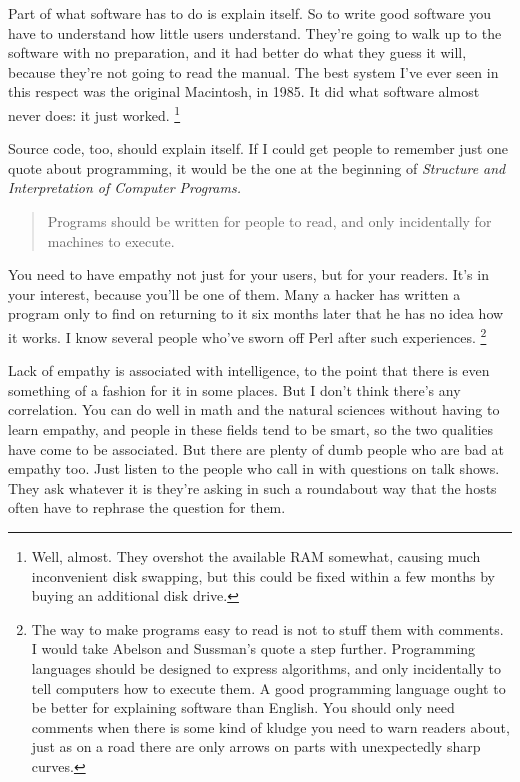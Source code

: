 Part of what software has to do is explain itself. So to write good
software you have to understand how little users understand. They're
going to walk up to the software with no preparation, and it had better
do what they guess it will, because they're not going to read the
manual. The best system I've ever seen in this respect was the original
Macintosh, in 1985. It did what software almost never does: it just
worked. \footnote{Well, almost. They overshot the available RAM somewhat, causing
much inconvenient disk swapping, but this could be fixed within a few
months by buying an additional disk drive.}

Source code, too, should explain itself. If I could get people to
remember just one quote about programming, it would be the one at the
beginning of \emph{Structure and Interpretation of Computer Programs.}

\begin{quote}
Programs should be written for people to read, and only incidentally for
machines to execute.
\end{quote}

You need to have empathy not just for your users, but for your readers.
It's in your interest, because you'll be one of them. Many a hacker has
written a program only to find on returning to it six months later that
he has no idea how it works. I know several people who've sworn off Perl
after such experiences. \footnote{The way to make programs easy to read is not to stuff them with
comments. I would take Abelson and Sussman's quote a step further.
Programming languages should be designed to express algorithms, and only
incidentally to tell computers how to execute them. A good programming
language ought to be better for explaining software than English. You
should only need comments when there is some kind of kludge you need to
warn readers about, just as on a road there are only arrows on parts
with unexpectedly sharp curves.}

Lack of empathy is associated with intelligence, to the point that there
is even something of a fashion for it in some places. But I don't think
there's any correlation. You can do well in math and the natural
sciences without having to learn empathy, and people in these fields
tend to be smart, so the two qualities have come to be associated. But
there are plenty of dumb people who are bad at empathy too. Just listen
to the people who call in with questions on talk shows. They ask
whatever it is they're asking in such a roundabout way that the hosts
often have to rephrase the question for them.

